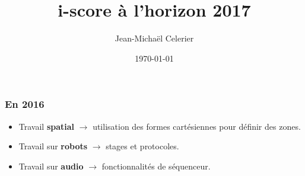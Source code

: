 \documentclass{beamer}
\title{i-score à l'horizon 2017}
\date{\today}
\author{Jean-Michaël Celerier}
\institute{LaBRI, Blue Yeti}
\begin{document}
    
\maketitle

\begin{frame}
    \frametitle{En 2016}    
    \Large
    \begin{itemize}
    	\item Travail \textbf{spatial} $\rightarrow$ utilisation des formes cartésiennes pour définir des zones.
    	\item Travail sur \textbf{robots} $\rightarrow$ stages et protocoles.
    	\item Travail sur \textbf{audio} $\rightarrow$ fonctionnalités de séquenceur.
    \end{itemize}
\end{frame}
\end{document}
